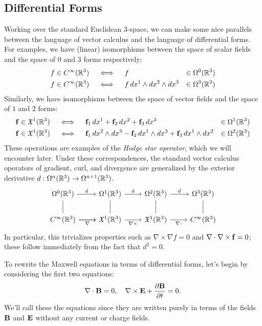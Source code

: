 \documentclass{article}
\begin{document}
\subsection{Differential Forms}

Working over the standard Euclidean $3$-space, we can make some nice parallels between the language of vector calculus and the language of differential forms. For examples, we have (linear) isomorphisms between the space of scalar fields and the space of $0$ and $3$ forms respectively:
\[
  \begin{aligned}
    f\in C^\infty(\mathbb{R}^3) \quad&\iff\quad f&\in \Omega^0(\mathbb{R}^3)\\
    f \in C^\infty(\mathbb{R}^3) \quad&\iff\quad f\,dx^1\wedge dx^2\wedge dx^3&\in \Omega^3(\mathbb{R}^3)
  \end{aligned}
\]
Similarly, we have isomorphisms between the space of vector fields and the space of $1$ and $2$ forms:
\[
    \begin{aligned}
    \mathbf{f}\in \mathfrak{X}^1(\mathbb{R}^3) \quad&\iff\quad \mathbf{f}_{1}\,dx^1 + \mathbf{f}_2\,dx^2+\mathbf{f}_3\,dx^3 &\in \Omega^1(\mathbb{R}^3)\\
    \mathbf{f}\in \mathfrak{X}^1(\mathbb{R}^3) \quad&\iff\quad \mathbf{f}_1\, dx^2\wedge dx^3 - \mathbf{f}_2\, dx^1\wedge dx^3 + \mathbf{f}_3\, dx^1\wedge dx^2 &\in \Omega^2(\mathbb{R}^3)\\
    \end{aligned}
\]
These operations are examples of the \emph{Hodge star operator}, which we will encounter later. Under these correspondences, the standard vector calculus operators of gradient, curl, and divergence are generalized by the exterior derivative $d : \Omega^n(\mathbb{R}^3) \to \Omega^{n+1}(\mathbb{R}^3)$.
\[\begin{tikzcd}
	{\Omega^0(\R^3)} & {\Omega^1(\R^3)} & {\Omega^2(\R^3)} & {\Omega^3(\R^3)} \\
	{C^\infty(\R^3)} & {\mathfrak{X}^1(\R^3)} & {\mathfrak{X}^1(\R^3)} & {C^\infty(\R^3)}
	\arrow["d", from=1-1, to=1-2]
	\arrow["d", from=1-2, to=1-3]
	\arrow["d", from=1-3, to=1-4]
	\arrow[no head, from=1-1, to=2-1]
	\arrow[no head, from=1-2, to=2-2]
	\arrow[no head, from=1-3, to=2-3]
	\arrow[no head, from=1-4, to=2-4]
	\arrow["\nabla"', from=2-1, to=2-2]
	\arrow["\nabla\times"', from=2-2, to=2-3]
	\arrow["\nabla\cdot"', from=2-3, to=2-4]
	\arrow[from=2-1, to=2-2]
\end{tikzcd}\]
In particular, this trivializes properties such as $\nabla\times\nabla f =0$ and $\nabla\cdot\nabla\times\mathbf{f}=0$; these follow immediately from the fact that $d^2=0$.

To rewrite the Maxwell equations in terms of differential forms, let's begin by considering the first two equations:
\[
  \nabla\cdot \mathbf{B} = 0, \quad \nabla\times \mathbf{E} + \frac{\partial \mathbf{B}}{\partial t} = 0.
\]
We'll call these the  equations since they are written purely in terms of the fields $\mathbf{B}$ and $\mathbf{E}$ without any current or charge fields.
\end{document}
